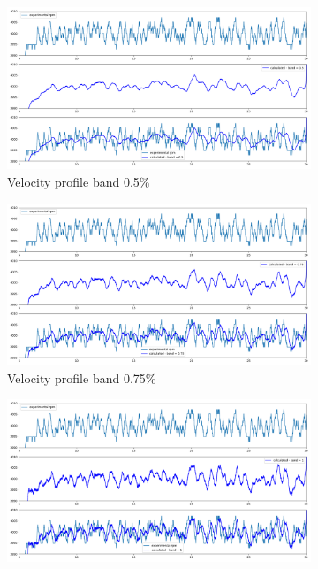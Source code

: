 \documentclass[10pt,fleqn,a4paper,twoside]{article}
\begin{document}
    \begin{figure}[H]

       
        \centering
        \begin{subfigure}{0.4\textwidth}
            \includegraphics[width=\textwidth]{Figures/rpm_analysis_mic4_band_0.5.png}
            \caption{Velocity profile band 0.5\%}
            \label{fig:second}
        \end{subfigure}
        \hfill
        \centering
        \begin{subfigure}{0.4\textwidth}
            \includegraphics[width=\textwidth]{Figures/rpm_analysis_mic4_band_0.75.png}
            \caption{Velocity profile band 0.75\%}
            \label{fig:third}
        \end{subfigure}
        \centering
        \hfill
        \begin{subfigure}{0.4\textwidth}
            \includegraphics[width=\textwidth]{Figures/rpm_analysis_mic4_band_1.png}

\end{subfigure}
\end{figure}
\end{document}
